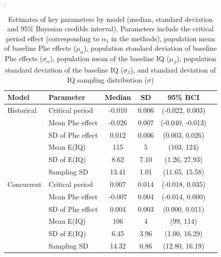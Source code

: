 \documentclass{svjour3}                     %
\begin{document}
\begin{table}[p]
    \caption{Estimates of key parameters by model (median, standard deviation and 95\% Bayesian credible interval). Parameters include the critical period effect (corresponding to $\alpha_1$ in the methods), population mean of baseline Phe effects ($\mu_{\alpha}$), population standard deviation of baseline Phe effects ($\sigma_{\alpha}$), population mean of the baseline IQ ($\mu_{\beta}$), population standard deviation of the baseline IQ ($\sigma_{\beta}$), and standard deviation of IQ sampling distribution ($\sigma$)}. \label{tab:params}
    \begin{tabular}{llcccc}
    \hline
    Model & Parameter & Median & SD & 95\% BCI \\
    \hline
    Historical & Critical period & -0.010 & 0.006 & (-0.022, 0.003)\\
    & Mean Phe effect & -0.026 & 0.007 & (-0.040, -0.013)\\
    & SD of Phe effect & 0.012 & 0.006 & (0.003, 0.026)\\
    & Mean E(IQ) & 115 & 5 & (103, 124)\\
    & SD of E(IQ) & 8.62 & 7.10 & (1.26, 27.93)\\
    & Sampling SD & 13.41 & 1.01 & (11.65, 15.58)\\
    Concurrent & Critical period & 0.007 & 0.014 & (-0.018, 0.035)\\
    & Mean Phe effect & -0.007 & 0.004 & (-0.014, 0.000)\\
    & SD of Phe effect & 0.004 & 0.003 & (0.000, 0.011)\\
    & Mean E(IQ) & 106 & 4 & (99, 114)\\
    & SD of E(IQ) & 6.45 & 3.96 & (1.00, 16.29)\\
    & Sampling SD & 14.32 & 0.86 & (12.80, 16.19)\\
    \hline
    \end{tabular}
\end{table}
\end{document}
